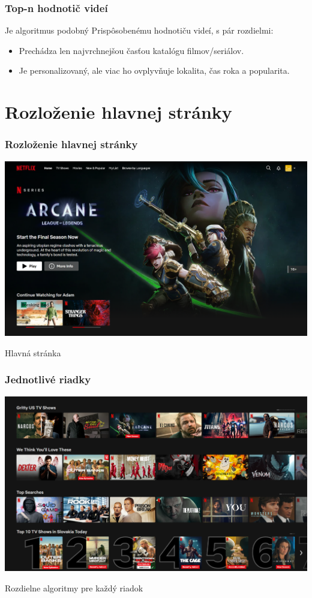 \documentclass{beamer}
\begin{document}
\begin{frame}[fragile=singleslide]\frametitle{Top-n hodnotič videí}
    Je algoritmus podobný Prispôsobenému hodnotiču videí, s pár rozdielmi:
    \begin{itemize}
        \item Prechádza len najvrchnejšou časťou katalógu filmov/seriálov.
        \item Je personalizovaný, ale viac ho ovplyvňuje lokalita, čas roka a popularita.
    \end{itemize}
\end{frame}




\section{Rozloženie hlavnej stránky}

\begin{frame}[fragile=singleslide]\frametitle{Rozloženie hlavnej stránky}

    \includegraphics[scale=.26]{NetflixMainPage1.png}

    {\tiny Hlavná stránka}


\end{frame}

\begin{frame}[fragile=singleslide]\frametitle{Jednotlivé riadky}

    \includegraphics[scale=.26]{NetflixMainPage2.png}

    {\tiny Rozdielne algoritmy pre každý riadok}


\end{frame}
\end{document}
